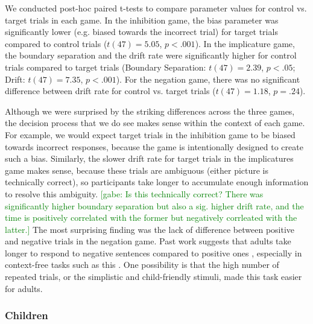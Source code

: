 \documentclass[10pt,letterpaper]{article}
\newcommand{\gabe}[1]{\textcolor{Green}{[gabe: #1]}}
\begin{document}
We conducted post-hoc paired t-tests to compare parameter values for control vs. target trials in each game.  In the inhibition game, the bias parameter was significantly lower (e.g. biased towards the incorrect trial) for target trials compared to control trials ($t(47) = 5.05$, $p< .001$).  In the implicature game, the boundary separation and the drift rate were significantly higher for control trials compared to target trials (Boundary Separation: $t(47) = 2.39$, $p< .05$; Drift: $t(47) = 7.35$, $p< .001$).  For the negation game, there was no significant difference between drift rate for control vs. target trials ($t(47) = 1.18$, $p = .24$).  

Although we were surprised by the striking differences across the three games, the decision process that we do see makes sense within the context of each game.  For example, we would expect target trials in the inhibition game to be biased towards incorrect responses, because the game is intentionally designed to create such a bias.  Similarly, the slower drift rate for target trials in the implicatures game makes sense, because these trials are ambiguous (either picture is technically correct), so participants take longer to accumulate enough information to resolve this ambiguity. \gabe{Is this technically correct? There was  significantly higher boundary separation but also a sig. higher drift rate, and the time is positively correlated with the former but negatively corrleated with the latter.} The most surprising finding was the lack of difference between positive and negative trials in the negation game.  Past work suggests that adults take longer to respond to negative sentences compared to positive ones \cite{hclark1972}, especially in context-free tasks such as this \cite{nordmeyer2014a}.  One possibility is that the high number of repeated trials, or the simplistic and child-friendly stimuli, made this task easier for adults.

\subsubsection{Children}
\end{document}
